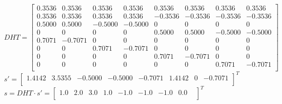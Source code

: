 	$
    DHT =
    \begin{bmatrix}
	0.3536 &    0.3536 &    0.3536 &   0.3536 &    0.3536 &   0.3536 &    0.3536 &    0.3536 \\
    0.3536 &    0.3536 &     0.3536 &   0.3536 &   -0.3536 &  -0.3536 &   -0.3536 &    -0.3536 \\
    0.5000 &    0.5000 &  -0.5000 &  -0.5000 &        0 &        0 &        0 &        0 \\
         0 &        0 &        0 &        0 &   0.5000 &   0.5000 &  -0.5000 &  -0.5000 \\
    0.7071 &  -0.7071 &        0 &        0 &        0 &        0 &        0 &        0 \\
         0 &        0 &   0.7071 &   -0.7071 &        0 &        0 &        0 &        0 \\
         0 &        0 &        0  &       0 &   0.7071 &  -0.7071 &        0 &        0 \\
         0 &        0 &        0   &      0 &        0 &        0 &   0.7071 &  -0.7071 \\

    \end{bmatrix}
    $ \\ $
    s' =
    \begin{bmatrix}
		1.4142 &   3.5355 &  -0.5000 &  -0.5000 &  -0.7071 &   1.4142 &        0 &  -0.7071 \\
    \end{bmatrix}
    ^T $ \\ $
    s = DHT \cdot s' =
    \begin{bmatrix}
    1.0 & 2.0 & 3.0 & 1.0 & -1.0 & -1.0 & -1.0 & 0.0 & \\
    \end{bmatrix}
    ^T $ \newline
	
\newpage
